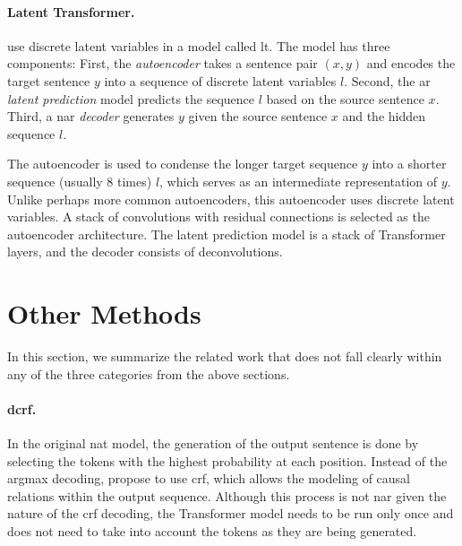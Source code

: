 \paragraph{Latent Transformer.} \citet{kaiser2018fast} use discrete latent
variables in a model called \acf{lt}. The model has three
components: First, the \emph{autoencoder} takes a sentence pair $(x, y)$ and
encodes the target sentence $y$ into a sequence of discrete latent variables
$l$. Second, the \acl{ar} \emph{latent prediction} model predicts the sequence
$l$ based on the source sentence $x$. Third, a \acl{nar} \emph{decoder}
generates $y$ given the source sentence $x$ and the hidden sequence $l$.

The autoencoder is used to condense the longer target sequence $y$ into a
shorter sequence (usually 8 times) $l$, which serves as an intermediate
representation of $y$. Unlike perhaps more common autoencoders, this
autoencoder uses discrete latent variables. A stack of convolutions with
residual connections is selected as the autoencoder architecture. The latent
prediction model is a stack of Transformer layers, and the decoder consists of
deconvolutions.

\section{Other Methods}%
\label{sec:nat:misc}

In this section, we summarize the related work that does not fall clearly
within any of the three categories from the above sections.

\paragraph{\Acl{dcrf}.} In the original \ac{nat} model, the generation of the
output sentence is done by selecting the tokens with the highest probability at
each position. Instead of the argmax decoding, \citet{sun2019fast} propose to
use \ac{crf}, which allows the modeling of causal relations within the output
sequence. Although this process is not \acl{nar} given the nature of the
\ac{crf} decoding, the Transformer model needs to be run only once and does not
need to take into account the tokens as they are being generated.

